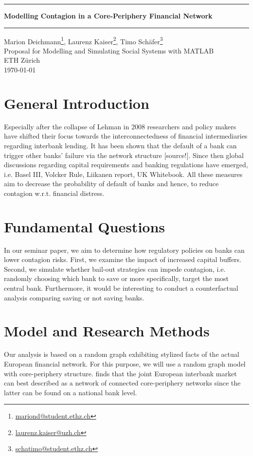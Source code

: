 \documentclass[12pt,a4paper,oneside]{article} %
\begin{document}
\begin{center}
\hrule \vspace{0.4cm}
{\LARGE \bfseries Modelling Contagion in a Core-Periphery
  Financial Network \\[0.4cm] } 
\hrule \vspace{0.4cm} 
Marion Deichmann\footnote{\href{mailto:mariond@student.ethz.ch}{mariond@student.ethz.ch}},
  Laurenz Kaiser\footnote{\href{mailto:laurenz.kaiser@uzh.ch}{laurenz.kaiser@uzh.ch}},
  Timo Schäfer\footnote{\href{mailto:schatimo@student.ethz.ch}{schatimo@student.ethz.ch}} \\[0.1cm]
Proposal for Modelling and Simulating Social Systems with MATLAB \\[0.1cm] ETH Zürich \\[0.1cm] \today 
\end{center}

\section*{General Introduction}
\noindent Especially after the collapse of Lehman in 2008 researchers and policy
makers have shifted their focus towards the interconnectedness of
financial intermediaries regarding interbank lending. It has been shown that the default of a bank
can trigger other banks' failure via the network structure [source!]. Since then global discussions regarding
capital requirements and banking regulations have emerged, i.e. Basel III, Volcker Rule, Liikanen
report, UK Whitebook. All these measures aim to decrease the
probability of default of banks and hence, to reduce contagion
w.r.t. financial distress.

\section*{Fundamental Questions}
In our seminar paper, we aim to determine how regulatory policies
on banks can lower contagion risks. First, we examine the impact of
increased capital buffers. Second, we simulate whether bail-out
strategies can impede contagion, i.e. randomly choosing which bank to
save or more specifically, target the most central bank. Furthermore,
it would be interesting to conduct a counterfactual analysis comparing
saving or not saving banks.

\section*{Model and Research Methods}
Our analysis is based on a random graph exhibiting stylized facts of the
actual European financial network. For this purpose, we will use a
\cite{Erdos1959} random graph model with core-periphery
structure. \cite{Georg2014} finds that the joint European interbank market
can best described as a network of connected core-periphery networks
since the latter can be found on a national bank level. 
\end{document}
